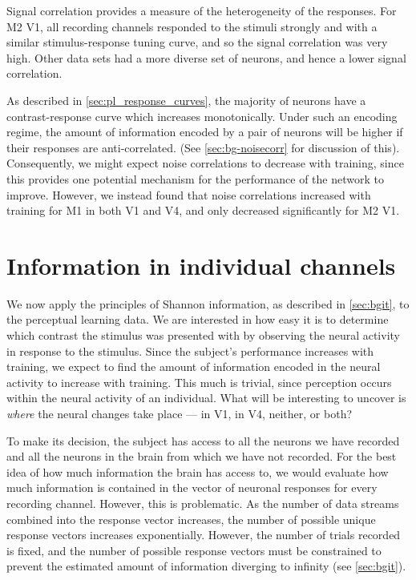 Signal correlation provides a measure of the heterogeneity of the responses.
For \ac{M2} \ac{V1}, all recording channels responded to the stimuli strongly and with a similar stimulus-response tuning curve, and so the signal correlation was very high.
Other data sets had a more diverse set of neurons, and hence a lower signal correlation.

As described in \autoref{sec:pl_response_curves}, the majority of neurons have a contrast-response curve which increases monotonically.
Under such an encoding regime, the amount of information encoded by a pair of neurons will be higher if their responses are anti-correlated.
(See \autoref{sec:bg-noisecorr} for discussion of this).
Consequently, we might expect noise correlations to decrease with training, since this provides one potential mechanism for the performance of the network to improve.
However, we instead found that noise correlations increased with training for \ac{M1} in both \ac{V1} and \ac{V4}, and only decreased significantly for \ac{M2} \ac{V1}.


\section{Information in individual channels}

We now apply the principles of Shannon information, as described in \autoref{sec:bgit}, to the perceptual learning data.
We are interested in how easy it is to determine which contrast the stimulus was presented with by observing the neural activity in response to the stimulus.
Since the subject's performance increases with training, we expect to find the amount of information encoded in the neural activity to increase with training.
This much is trivial, since perception occurs within the neural activity of an individual.
What will be interesting to uncover is \textit{where} the neural changes take place --- in \ac{V1}, in \ac{V4}, neither, or both?

To make its decision, the subject has access to all the neurons we have recorded and all the neurons in the brain from which we have not recorded.
For the best idea of how much information the brain has access to, we would evaluate how much information is contained in the vector of neuronal responses for every recording channel.
However, this is problematic.
As the number of data streams combined into the response vector increases, the number of possible unique response vectors increases exponentially.
However, the number of trials recorded is fixed, and the number of possible response vectors must be constrained to prevent the estimated amount of information diverging to infinity (see \autoref{sec:bgit}).

